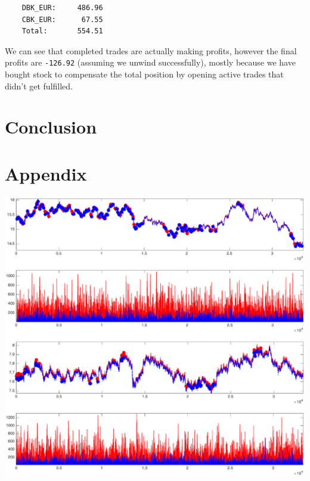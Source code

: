 \documentclass[8 pt]{article}
\newenvironment{Figure}
  {\par\medskip\noindent\minipage{\linewidth}}
  {\endminipage\par\medskip}
\begin{document}
\begin{multicols*}{2}
\begin{verbatim}
    DBK_EUR:     486.96
    CBK_EUR:      67.55
    Total:       554.51
  \end{verbatim}

  We can see that completed trades are actually making profits, however the final profits are \texttt{-126.92} (assuming we unwind successfully), mostly because we have bought stock to compensate the total position by opening active trades that didn't get fulfilled.

  \section{Conclusion}

\end{multicols*}

\section{Appendix}

\begin{Figure}
  \begin{center}
    \includegraphics[width=\textwidth]{graphs/result_CBKDBK1.eps}
    \label{fig:results_1}
  \end{center}
\end{Figure}
\end{document}

